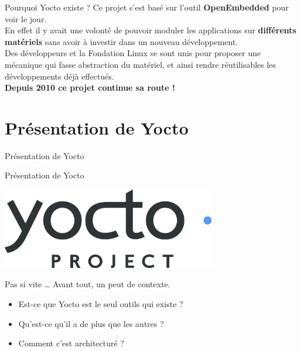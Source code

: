 \documentclass[compress]{smilebeamer}
\begin{document}
\begin{frame}
\begin{block}{Pourquoi Yocto existe ?}
	Ce projet s'est basé sur l'outil \textbf{OpenEmbedded} pour voir le jour.\newline{}\\
	En effet il y avait une volonté de pouvoir moduler les applications sur
	\textbf{différents matériels} sans avoir à investir dans un nouveau développement.
	\newline{}\\
	Des développeurs et la Fondation Linux se sont unis pour proposer	une 
	mécanique qui fasse abstraction du matériel, et ainsi rendre réutilisables
	les développements déjà effectués.\newline{}\\
	\textbf{Depuis 2010 ce projet continue sa route !}
\end{block}
\end{frame}


\section{Présentation de Yocto}

\begin{frame}{Présentation de Yocto}
\end{frame}

\begin{frame}{Présentation de Yocto}
\begin{center}
\includegraphics[width=0.7\textwidth]{logos/yocto-project-transp.png}
\end{center}
\end{frame}

\begin{frame}{Pas si vite …}
Avant tout, un peut de contexte.\newline
\newline
\begin{itemize}
	\item Est-ce que Yocto est le seul outils qui existe ?
	\item Qu'est-ce qu'il a de plus que les autres ?
	\item Comment c'est architecturé ?
\end{itemize}
\end{frame}
\end{document}
